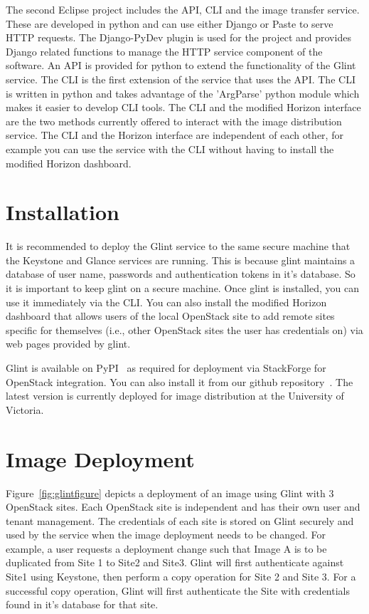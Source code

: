 \documentclass[a4paper]{jpconf}
\begin{document}
The second Eclipse project includes the API, CLI and the image transfer service. These are developed in python and can use either Django or Paste to serve HTTP requests. The Django-PyDev plugin is used for the project and provides Django related functions to manage the HTTP service component of the software. An API is provided for python to extend the functionality of the Glint service. The CLI is the first extension of the service that uses the API. The CLI is written in python and takes advantage of the 'ArgParse' python module which makes it easier to develop CLI tools. The CLI and the modified Horizon interface are the two methods currently offered to interact with the image distribution service. The CLI and the Horizon interface are independent of each other, for example you can use the service with the CLI without having to install the modified Horizon dashboard.


\section{Installation}
It is recommended to deploy the Glint service to the same secure machine that the Keystone and Glance services are running. This is because glint maintains a database of user name, passwords and authentication tokens in it's database. So it is important to keep glint on a secure machine. Once glint is installed, you can use it immediately via the CLI. You can also install the modified Horizon dashboard that allows users of the local OpenStack site to add remote sites specific for themselves (i.e., other OpenStack sites the user has credentials on) via web pages provided by glint.  

Glint is available on PyPI~\cite{pypi} as required for deployment via StackForge for OpenStack integration. You can also install it from our github repository~\cite{glint}. The latest version is currently deployed for image distribution at the University of Victoria. 

\section{Image Deployment}
Figure~\ref{fig:glintfigure} depicts a deployment of an image using Glint with 3 OpenStack sites. Each OpenStack site is independent and has their own user and tenant management. The credentials of each site is stored on Glint securely and used by the service when the image deployment needs to be changed. For example, a user requests a deployment change such that Image A is to be duplicated from Site 1 to Site2 and Site3. Glint will first authenticate against Site1 using Keystone, then perform a copy operation for Site 2 and Site 3. For a successful copy operation, Glint will first authenticate the Site with credentials found in it's database for that site.
\end{document}
